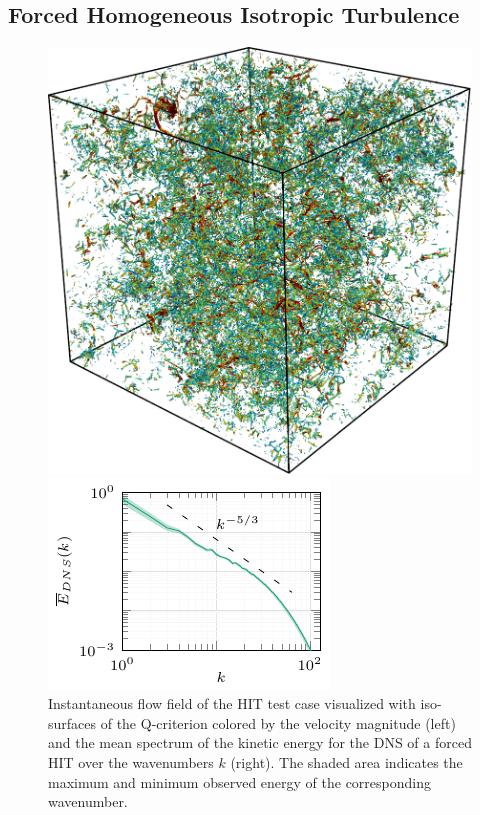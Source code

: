 \subsection{Forced Homogeneous Isotropic Turbulence}

\begin{figure}
  \begin{minipage}[t]{0.443\linewidth}
    \includegraphics[width=\linewidth]{./fig/HIT.pdf}%
  \end{minipage}
  \hfill
  \begin{minipage}[t]{0.53\linewidth}
    \includegraphics[width=\linewidth]{./tikz_double_column/draft-figure0.pdf}%
  \end{minipage}
  \caption{Instantaneous flow field of the HIT test case visualized with iso-surfaces of the Q-criterion colored by the velocity magnitude (left) and the mean spectrum of the kinetic energy for the DNS of a forced HIT over the wavenumbers $k$ (right). The shaded area indicates the maximum and minimum observed energy of the corresponding wavenumber.}
  \label{fig:HIT}
\end{figure}

